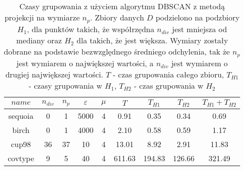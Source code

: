 \begin{table}
	\centering
	\begin{tabular}{ | c | c | c | c |  c | c | c | c | c | }
		\hline
		$ name $ & $ n_{div} $ & $ n_p $ & $ \varepsilon $ & $ \mu $ & $ T $ & $ T_{H1} $ & $ T_{H2} $ & $ T_{H1}+T_{H2} $\\ \hline
		 sequoia  & 0 & 1 & 5000 & 4 & 0.91 & 0.35 & 0.34 & 0.69 \\ \hline
		 birch  & 0 & 1 & 4000 & 4 & 2.10 & 0.58 & 0.59 & 1.17 \\ \hline
		 cup98  & 36 & 37 & 10 & 4 & 13.01 & 8.92 & 2.91 & 11.83 \\ \hline
		covtype & 9 & 5 & 40 & 4 & 611.63 & 194.83 & 126.66 & 321.49 \\ \hline
	\end{tabular}
	\caption{Czasy grupowania z użyciem algorytmu DBSCAN z metodą projekcji na wymiarze $ n_p $. Zbiory danych $ D $ podzielono na podzbiory $ H_1 $, dla punktów takich, że współrzędna $ n_{div} $ jest mniejsza od mediany oraz $ H_2 $ dla takich, że jest większa. Wymiary zostały dobrane na podstawie bezwzględnego średniego odchylenia, tak że $ n_p $ jest wymiarem o największej wartości, a $ n_{div} $ jest wymiarem o drugiej największej wartości. $ T $ - czas grupowania całego zbioru, $ T_{H1} $ - czasy grupowania w $ H_1 $, $ T_{H2} $ - czas grupowania w $ H_2 $}\label{qscan:projection-space-cut-times}
\end{table}